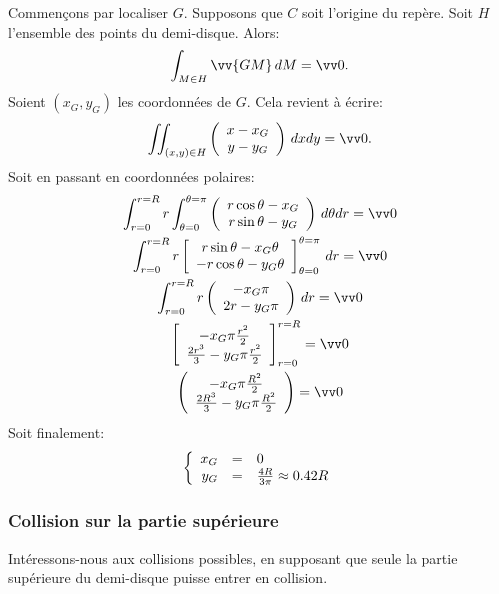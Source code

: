 \documentclass[a4paper]{article}
\begin{document}
Commençons par localiser $G$. Supposons que $C$ soit l'origine du repère. Soit $H$ l'ensemble des points du demi-disque.
Alors:
\[
  \int_{M\in H} \vv{GM} \, dM = \vv 0.
\]
Soient $(x_G, y_G)$ les coordonnées de $G$. Cela revient à écrire:
\[
  \iint_{(x,y)\in H}
   \left(
     \begin{array}{c}
      x - x_G \\
      y - y_G
     \end{array}
   \right) \, dxdy = \vv 0.
\]
Soit en passant en coordonnées polaires:
\begin{gather*}
  \int_{r=0}^{r=R}
  r
  \int_{\theta=0}^{\theta=\pi}
   \left(
     \begin{array}{c}
      r\cos\theta - x_G \\
      r\sin\theta - y_G
     \end{array}
   \right) \, d\theta dr = \vv 0 \\
%
  \int_{r=0}^{r=R}
  r
   \left[
     \begin{array}{c}
      r\sin\theta - x_G\theta \\
      -r\cos\theta - y_G\theta
     \end{array}
   \right]_{\theta=0}^{\theta=\pi} \, dr = \vv 0 \\
%
  \int_{r=0}^{r=R}
  r
  \left(
    \begin{array}{c}
      - x_G\pi \\
      2r - y_G\pi
    \end{array}
 \right) \, dr = \vv 0 \\
%
  \left[
    \begin{array}{c}
      - x_G\pi\frac{r^2}{2} \\
      \frac{2r^3}{3} - y_G\pi\frac{r^2}{2}
    \end{array}
  \right]_{r=0}^{r=R} = \vv 0 \\
%
  \left(
    \begin{array}{c}
      - x_G\pi\frac{R^2}{2} \\
      \frac{2R^3}{3} - y_G\pi\frac{R^2}{2}
    \end{array}
  \right) = \vv 0 \\
\end{gather*}
Soit finalement:
\[
  \left\{
    \begin{array}{r c l}
      x_G &=& 0 \\
      y_G &=& \frac{4R}{3\pi} \approx 0.42 R
    \end{array}
  \right.
\]

\subsubsection{Collision sur la partie supérieure}
Intéressons-nous aux collisions possibles,
en supposant que seule la partie supérieure du demi-disque puisse entrer en collision.
\end{document}
